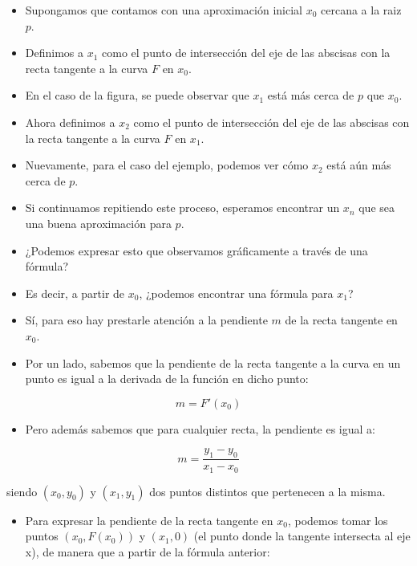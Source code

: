 \documentclass[]{book}
\providecommand{\tightlist}{%
  \setlength{\itemsep}{0pt}\setlength{\parskip}{0pt}}
\begin{document}
\begin{itemize}
\item
  Supongamos que contamos con una aproximación inicial \(x_0\) cercana a la raiz \(p\).
\item
  Definimos a \(x_1\) como el punto de intersección del eje de las abscisas con la recta tangente a la curva \(F\) en \(x_0\).
\item
  En el caso de la figura, se puede observar que \(x_1\) está más cerca de \(p\) que \(x_0\).
\item
  Ahora definimos a \(x_2\) como el punto de intersección del eje de las abscisas con la recta tangente a la curva \(F\) en \(x_1\).
\item
  Nuevamente, para el caso del ejemplo, podemos ver cómo \(x_2\) está aún más cerca de \(p\).
\item
  Si continuamos repitiendo este proceso, esperamos encontrar un \(x_n\) que sea una buena aproximación para \(p\).
\item
  ¿Podemos expresar esto que observamos gráficamente a través de una fórmula?
\item
  Es decir, a partir de \(x_0\), ¿podemos encontrar una fórmula para \(x_1\)?
\item
  Sí, para eso hay prestarle atención a la pendiente \(m\) de la recta tangente en \(x_0\).
\item
  Por un lado, sabemos que la pendiente de la recta tangente a la curva en un punto es igual a la derivada de la función en dicho punto:
\end{itemize}

\begin{equation}
\label{eq:deriv1}
m = F'(x_0)
\end{equation}

\begin{itemize}
\tightlist
\item
  Pero además sabemos que para cualquier recta, la pendiente es igual a:
\end{itemize}

\begin{equation}
\label{eq:deriv2}
m = \frac{y_1 - y_0}{x_1 - x_0}
\end{equation}

siendo \((x_0, y_0)\) y \((x_1, y_1)\) dos puntos distintos que pertenecen a la misma.

\begin{itemize}
\tightlist
\item
  Para expresar la pendiente de la recta tangente en \(x_0\), podemos tomar los puntos \((x_0, F(x_0))\) y \((x_1, 0)\) (el punto donde la tangente intersecta al eje x), de manera que a partir de la fórmula anterior:
\end{itemize}
\end{document}
